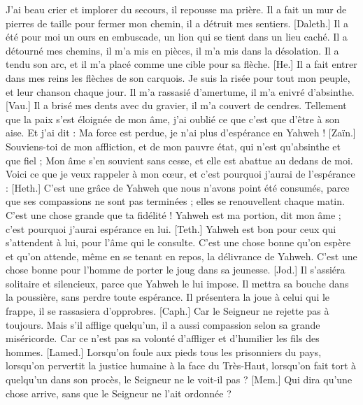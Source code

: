 \begin{multicols}{2}
J'ai beau crier et implorer du secours, il repousse ma prière.
Il a fait un mur de pierres de taille pour fermer mon chemin, il a détruit mes sentiers.
[Daleth.] Il a été pour moi un ours en embuscade, un lion qui se tient dans un lieu caché.
Il a détourné mes chemins, il m’a mis en pièces, il m’a mis dans la désolation.
Il a tendu son arc, et il m’a placé comme une cible pour sa flèche.
[He.] Il a fait entrer dans mes reins les flèches de son carquois.
Je suis la risée pour tout mon peuple, et leur chanson chaque jour.
Il m’a rassasié d’amertume, il m’a enivré d’absinthe.
[Vau.] Il a brisé mes dents avec du gravier, il m’a couvert de cendres.
Tellement que la paix s’est éloignée de mon âme, j’ai oublié ce que c’est que d’être à son aise.
Et j’ai dit : Ma force est perdue, je n'ai plus d'espérance en Yahweh !
[Zaïn.] Souviens-toi de mon affliction, et de mon pauvre état, qui n’est qu’absinthe et que fiel ;
Mon âme s’en souvient sans cesse, et elle est abattue au dedans de moi.
Voici ce que je veux rappeler à mon cœur, et c’est pourquoi j’aurai de l'espérance :
[Heth.] C’est une grâce de Yahweh que nous n’avons point été consumés, parce que ses compassions ne sont pas terminées ;
elles se renouvellent chaque matin. C’est une chose grande que ta fidélité !
Yahweh est ma portion, dit mon âme ; c’est pourquoi j’aurai espérance en lui.
[Teth.] Yahweh est bon pour ceux qui s’attendent à lui, pour l’âme qui le consulte.
C’est une chose bonne qu’on espère et qu'on attende, même en se tenant en repos, la délivrance de Yahweh.
C’est une chose bonne pour l’homme de porter le joug dans sa jeunesse.
[Jod.] Il s'assiéra solitaire et silencieux, parce que Yahweh le lui impose.
Il mettra sa bouche dans la poussière, sans perdre toute espérance.
Il présentera la joue à celui qui le frappe, il se rassasiera d’opprobres.
[Caph.] Car le Seigneur ne rejette pas à toujours.
Mais s’il afflige quelqu’un, il a aussi compassion selon sa grande miséricorde.
Car ce n’est pas sa volonté d'affliger et d'humilier les fils des hommes.
[Lamed.] Lorsqu’on foule aux pieds tous les prisonniers du pays,
lorsqu’on pervertit la justice humaine à la face du Très-Haut,
lorsqu’on fait tort à quelqu’un dans son procès, le Seigneur ne le voit-il pas ?
[Mem.] Qui dira qu'une chose arrive, sans que le Seigneur ne l’ait ordonnée ?

\end{multicols}

